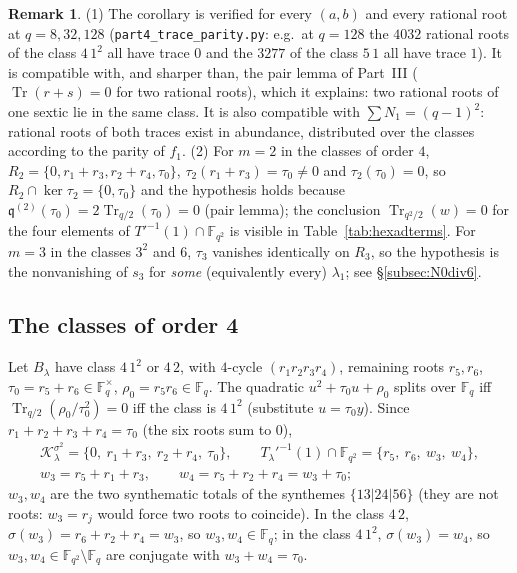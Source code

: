 \documentclass[12pt,a4paper]{amsart}
\theoremstyle{definition}
\newtheorem{remark}[theorem]{Remark}
\newcommand{\F}{\mathbb{F}}
\newcommand{\Tr}{\operatorname{Tr}}
\newcommand{\Kk}{\mathcal{K}}
\newcommand{\qq}{\mathfrak{q}}
\begin{document}
\begin{remark}
(1) The corollary is verified for every $(a,b)$ and every rational root at $q=8,32,128$ (\texttt{part4\_trace\_parity.py}: e.g.\ at $q=128$ the $4032$ rational roots of the class $4\,1^2$ all have trace $0$ and the $3277$ of the class $5\,1$ all have trace $1$). It is compatible with, and sharper than, the pair lemma of Part~III ($\Tr(r+s)=0$ for two rational roots), which it explains: two rational roots of one sextic lie in the same class. It is also compatible with $\sum N_1=(q-1)^2$: rational roots of both traces exist in abundance, distributed over the classes according to the parity of $f_1$. (2) For $m=2$ in the classes of order $4$, $R_2=\{0,r_1+r_3,r_2+r_4,\tau_0\}$, $\tau_2(r_1+r_3)=\tau_0\ne0$ and $\tau_2(\tau_0)=0$, so $R_2\cap\ker\tau_2=\{0,\tau_0\}$ and the hypothesis holds because $\qq^{(2)}(\tau_0)=2\Tr_{q/2}(\tau_0)=0$ (pair lemma); the conclusion $\Tr_{q^2/2}(w)=0$ for the four elements of $T'^{-1}(1)\cap\F_{q^2}$ is visible in Table~\ref{tab:hexadterms}. For $m=3$ in the classes $3^2$ and $6$, $\tau_3$ vanishes identically on $R_3$, so the hypothesis is the nonvanishing of $s_3$ for \emph{some} (equivalently every) $\lambda_1$; see \S\ref{subsec:N0div6}.
\end{remark}

\subsection{The classes of order 4}\label{subsec:order4}
Let $B_\lambda$ have class $4\,1^2$ or $4\,2$, with $4$-cycle $(r_1r_2r_3r_4)$, remaining roots $r_5,r_6$, $\tau_0=r_5+r_6\in\F_q^\times$, $\rho_0=r_5r_6\in\F_q$. The quadratic $u^2+\tau_0u+\rho_0$ splits over $\F_q$ iff $\Tr_{q/2}(\rho_0/\tau_0^2)=0$ iff the class is $4\,1^2$ (substitute $u=\tau_0y$). Since $r_1+r_2+r_3+r_4=\tau_0$ (the six roots sum to $0$),
\begin{gather*}
\Kk_\lambda^{\sigma^2}=\{0,\ r_1+r_3,\ r_2+r_4,\ \tau_0\},\qquad T_\lambda'^{-1}(1)\cap\F_{q^2}=\{r_5,\ r_6,\ w_3,\ w_4\},\\
w_3=r_5+r_1+r_3,\qquad w_4=r_5+r_2+r_4=w_3+\tau_0 ;
\end{gather*}
$w_3,w_4$ are the two synthematic totals of the synthemes $\{13|24|56\}$ (they are not roots: $w_3=r_j$ would force two roots to coincide). In the class $4\,2$, $\sigma(w_3)=r_6+r_2+r_4=w_3$, so $w_3,w_4\in\F_q$; in the class $4\,1^2$, $\sigma(w_3)=w_4$, so $w_3,w_4\in\F_{q^2}\setminus\F_q$ are conjugate with $w_3+w_4=\tau_0$.
\end{document}
